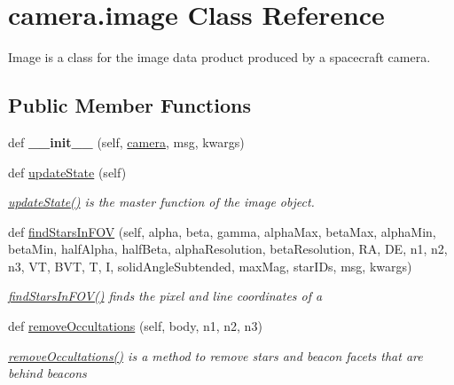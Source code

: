 \hypertarget{classcamera_1_1image}{}\section{camera.\+image Class Reference}
\label{classcamera_1_1image}


Image is a class for the image data product produced by a spacecraft camera.  


\subsection*{Public Member Functions}
\begin{DoxyCompactItemize}
\item 
\mbox{\label{classcamera_1_1image_aad473dd65c4639f4ef1fa2f12ea90add}} 
def {\bfseries \+\_\+\+\_\+init\+\_\+\+\_\+} (self, \hyperlink{classcamera_1_1camera}{camera}, msg, kwargs)
\item 
def \hyperlink{classcamera_1_1image_ad5fcc766f1a0be37d8437f46d0fe720d}{update\+State} (self)
\begin{DoxyCompactList}\small\item\em \hyperlink{classcamera_1_1image_ad5fcc766f1a0be37d8437f46d0fe720d}{update\+State()} is the master function of the image object. \end{DoxyCompactList}\item 
def \hyperlink{classcamera_1_1image_a07f3ece0789fb705f57985642b41ae47}{find\+Stars\+In\+F\+OV} (self, alpha, beta, gamma, alpha\+Max, beta\+Max, alpha\+Min, beta\+Min, half\+Alpha, half\+Beta, alpha\+Resolution, beta\+Resolution, RA, DE, n1, n2, n3, VT, B\+VT, T, I, solid\+Angle\+Subtended, max\+Mag, star\+I\+Ds, msg, kwargs)
\begin{DoxyCompactList}\small\item\em \hyperlink{classcamera_1_1image_a07f3ece0789fb705f57985642b41ae47}{find\+Stars\+In\+F\+O\+V()} finds the pixel and line coordinates of a \end{DoxyCompactList}\item 
def \hyperlink{classcamera_1_1image_a47cc2d7f893043af0532d8fc291035e4}{remove\+Occultations} (self, body, n1, n2, n3)
\begin{DoxyCompactList}\small\item\em \hyperlink{classcamera_1_1image_a47cc2d7f893043af0532d8fc291035e4}{remove\+Occultations()} is a method to remove stars and beacon facets that are behind beacons \end{DoxyCompactList}\item 

\end{DoxyCompactItemize}
